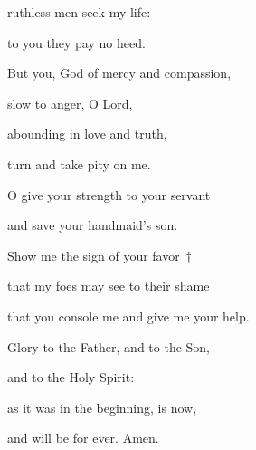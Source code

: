 ruthless men seek my life:~\GreStar{}~\nopagebreak

to you they pay no heed.

\noindent But you, God of mercy and compassion,~\GreStar{}~\nopagebreak

slow to anger, O Lord,

\noindent abounding in love and truth,~\GreStar{}~\nopagebreak

turn and take pity on me.

\noindent O give your strength to your servant~\GreStar{}~\nopagebreak

and save your handmaid’s son.

\noindent Show me the sign of your favor~†~\nopagebreak

that my foes may see to their shame~\GreStar{}~\nopagebreak

that you console me and give me your help.

\noindent Glory to the Father, and to the Son,~\GreStar{}~\nopagebreak

and to the Holy Spirit:

\noindent as it was in the beginning, is now,~\GreStar{}~\nopagebreak

and will be for ever. Amen.
